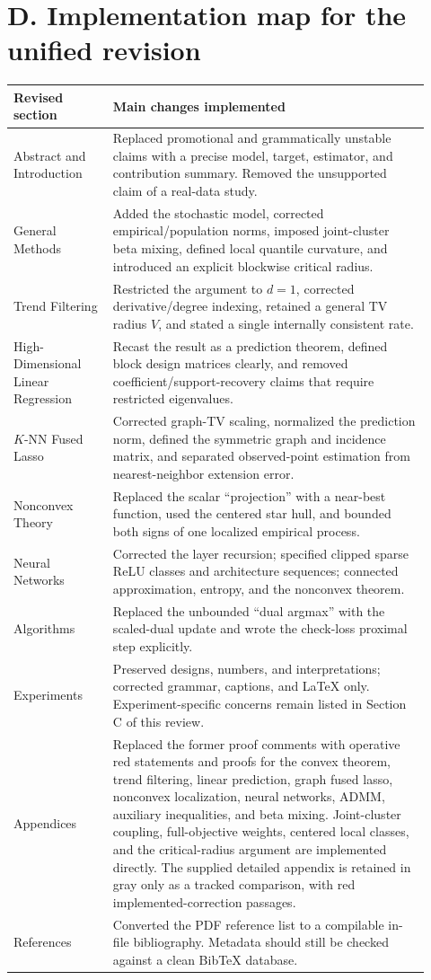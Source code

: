 \documentclass[11pt]{article}
\begin{document}
\clearpage
\section*{D. Implementation map for the unified revision}
\begin{longtable}{L{0.22\linewidth}L{0.70\linewidth}}
\toprule
\textbf{Revised section} & \textbf{Main changes implemented}\\
\midrule
Abstract and Introduction & Replaced promotional and grammatically unstable claims with a precise model, target, estimator, and contribution summary. Removed the unsupported claim of a real-data study.\\
General Methods & Added the stochastic model, corrected empirical/population norms, imposed joint-cluster beta mixing, defined local quantile curvature, and introduced an explicit blockwise critical radius.\\
Trend Filtering & Restricted the argument to $d=1$, corrected derivative/degree indexing, retained a general TV radius $V$, and stated a single internally consistent rate.\\
High-Dimensional Linear Regression & Recast the result as a prediction theorem, defined block design matrices clearly, and removed coefficient/support-recovery claims that require restricted eigenvalues.\\
$K$-NN Fused Lasso & Corrected graph-TV scaling, normalized the prediction norm, defined the symmetric graph and incidence matrix, and separated observed-point estimation from nearest-neighbor extension error.\\
Nonconvex Theory & Replaced the scalar “projection” with a near-best function, used the centered star hull, and bounded both signs of one localized empirical process.\\
Neural Networks & Corrected the layer recursion; specified clipped sparse ReLU classes and architecture sequences; connected approximation, entropy, and the nonconvex theorem.\\
Algorithms & Replaced the unbounded “dual argmax” with the scaled-dual update and wrote the check-loss proximal step explicitly.\\
Experiments & Preserved designs, numbers, and interpretations; corrected grammar, captions, and LaTeX only. Experiment-specific concerns remain listed in Section C of this review.\\
Appendices & Replaced the former proof comments with operative red statements and proofs for the convex theorem, trend filtering, linear prediction, graph fused lasso, nonconvex localization, neural networks, ADMM, auxiliary inequalities, and beta mixing. Joint-cluster coupling, full-objective weights, centered local classes, and the critical-radius argument are implemented directly. The supplied detailed appendix is retained in gray only as a tracked comparison, with red implemented-correction passages.\\
References & Converted the PDF reference list to a compilable in-file bibliography. Metadata should still be checked against a clean BibTeX database.\\
\bottomrule
\end{longtable}
\end{document}
